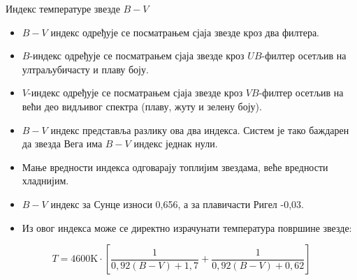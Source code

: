 \documentclass[aspectratio=169, xcolor=table, 10pt]{beamer}
\theoremstyle{definition}
\begin{document}
\begin{frame}{Индекс температуре звезде $B-V$}
  \begin{itemize}
    \item $B-V$ индекс одређује се посматрањем сјаја звезде кроз два филтера.
    \item $B$-индекс одређује се посматрањем сјаја звезде кроз $UB$-филтер осетљив на ултраљубичасту и плаву боју.
    \item $V$-индекс одређује се посматрањем сјаја звезде кроз $VB$-филтер осетљив на већи део видљивог спектра (плаву, жуту и зелену боју).
    \item $B-V$ индекс представља разлику ова два индекса. Систем је тако баждарен да звезда Вега има $B-V$ индекс једнак нули.
    \item Мање вредности индекса одговарају топлијим звездама, веће вредности хладнијим.
    \item $B-V$ индекс за Сунце износи 0,656, а за плавичасти Ригел -0,03.
    \item Из овог индекса може се директно израчунати температура површине звезде:
  \end{itemize}
  \begin{equation*}
  T=4600\text{K}\cdot\left[\frac{1}{0,92(B-V)+1,7}+\frac{1}{0,92(B-V)+0,62}\right]
  \end{equation*}
\end{frame}
\end{document}
